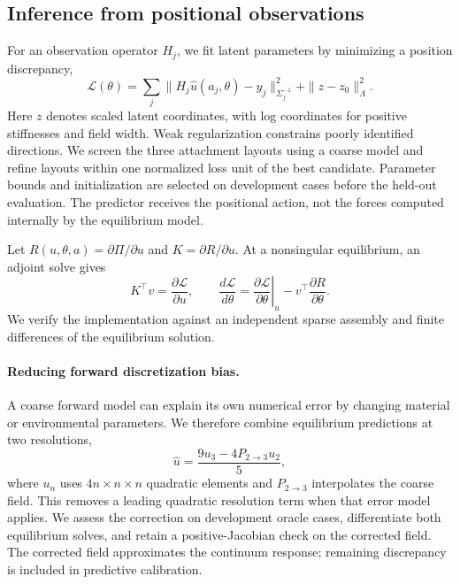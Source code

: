 \documentclass[10pt,twocolumn,letterpaper]{article}
\begin{document}
\subsection{Inference from positional observations}
For an observation operator $H_j$, we fit latent parameters by minimizing a position discrepancy,
\begin{equation}
 \mathcal L(\theta)=\sum_j\|H_j \hat u(a_j,\theta)-y_j\|^2_{\Sigma_j^{-1}}+\|z-z_0\|^2_{\Lambda}.
\end{equation}
Here $z$ denotes scaled latent coordinates, with log coordinates for positive stiffnesses and field width. Weak regularization constrains poorly identified directions. We screen the three attachment layouts using a coarse model and refine layouts within one normalized loss unit of the best candidate. Parameter bounds and initialization are selected on development cases before the held-out evaluation. The predictor receives the positional action, not the forces computed internally by the equilibrium model.

Let $R(u,\theta,a)=\partial\Pi/\partial u$ and $K=\partial R/\partial u$. At a nonsingular equilibrium, an adjoint solve gives
\begin{equation}
 K^\top v=\frac{\partial\mathcal L}{\partial u},\qquad
 \frac{d\mathcal L}{d\theta}=\left.\frac{\partial\mathcal L}{\partial\theta}\right|_u-v^\top\frac{\partial R}{\partial\theta}.
\end{equation}
We verify the implementation against an independent sparse assembly and finite differences of the equilibrium solution.

\paragraph{Reducing forward discretization bias.}
A coarse forward model can explain its own numerical error by changing material or environmental parameters. We therefore combine equilibrium predictions at two resolutions,
\begin{equation}
 \hat u=\frac{9u_3-4P_{2\to3}u_2}{5},
\end{equation}
where $u_n$ uses $4n\times n\times n$ quadratic elements and $P_{2\to3}$ interpolates the coarse field. This removes a leading quadratic resolution term when that error model applies. We assess the correction on development oracle cases, differentiate both equilibrium solves, and retain a positive-Jacobian check on the corrected field. The corrected field approximates the continuum response; remaining discrepancy is included in predictive calibration.
\end{document}

